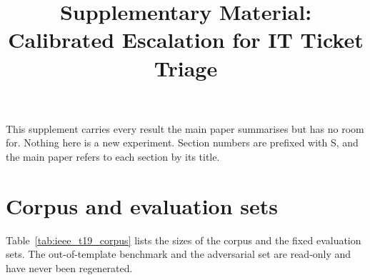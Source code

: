 \documentclass[conference,onecolumn,a4paper]{IEEEtran}
\begin{document}
\title{Supplementary Material:\\Calibrated Escalation for IT Ticket Triage}
\author{
}
\maketitle

This supplement carries every result the main paper summarises but has no room for. Nothing here is a new experiment. Section numbers are prefixed with S, and the main paper refers to each section by its title.

\section{Corpus and evaluation sets}
Table~\ref{tab:ieee_t19_corpus} lists the sizes of the corpus and the fixed evaluation sets. The out-of-template benchmark and the adversarial set are read-only and have never been regenerated.


\end{document}

